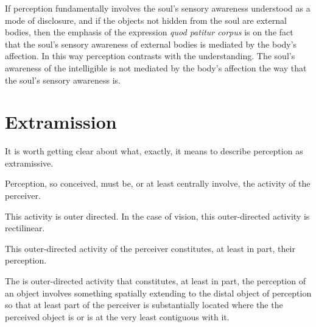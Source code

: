\documentclass[12pt]{article}
\begin{document}
If perception fundamentally involves the soul's sensory awareness understood as a mode of disclosure, and if the objects not hidden from the soul are external bodies, then the emphasis of the expression \emph{quod patitur corpus} is on the fact that the soul's sensory awareness of external bodies is mediated by the body's affection. In this way perception contrasts with the understanding. The soul's awareness of the intelligible is not mediated by the body's affection the way that the soul's sensory awareness is.


\section{Extramission} %
\label{sec:extramission}

It is worth getting clear about what, exactly, it means to describe perception as extramissive.

Perception, so conceived, must be, or at least centrally involve, the activity of the perceiver.

This activity is outer directed. In the case of vision, this outer-directed activity is rectilinear.

This outer-directed activity of the perceiver constitutes, at least in part, their perception.

The is outer-directed activity that constitutes, at least in part, the perception of an object involves something spatially extending to the distal object of perception so that at least part of the perceiver is substantially located where the the perceived object is or is at the very least contiguous with it.






\nocite{Tourscher:1933rw}



\end{document}
